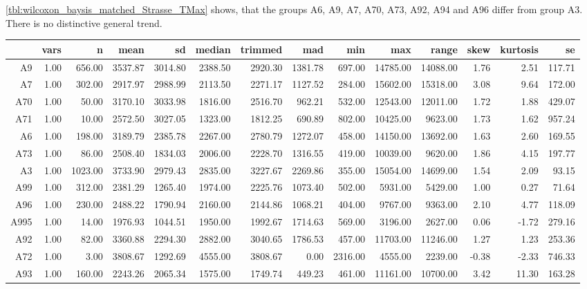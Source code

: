 \cref{tbl:wilcoxon_baysis_matched_Strasse_TMax} shows, that the groups A6, A9, A7, A70, A73, A92, A94 and A96 differ from group A3. There is no distinctive general trend.
\begin{table}[ht!]
	\tiny
	\centering
  \begin{tabular}{rrrrrrrrrrrrrr}
    \hline
    & vars & n & mean & sd & median & trimmed & mad & min & max & range & skew & kurtosis & se \\ 
    \hline
    A9   & 1.00 & 656.00 & 3537.87 & 3014.80 & 2388.50 & 2920.30 & 1381.78 & 697.00 & 14785.00 & 14088.00 & 1.76 & 2.51 & 117.71 \\ 
    A7   & 1.00 & 302.00 & 2917.97 & 2988.99 & 2113.50 & 2271.17 & 1127.52 & 284.00 & 15602.00 & 15318.00 & 3.08 & 9.64 & 172.00 \\ 
    A70  & 1.00 & 50.00 & 3170.10 & 3033.98 & 1816.00 & 2516.70 & 962.21 & 532.00 & 12543.00 & 12011.00 & 1.72 & 1.88 & 429.07 \\ 
    A71  & 1.00 & 10.00 & 2572.50 & 3027.05 & 1323.00 & 1812.25 & 690.89 & 802.00 & 10425.00 & 9623.00 & 1.73 & 1.62 & 957.24 \\ 
    A6   & 1.00 & 198.00 & 3189.79 & 2385.78 & 2267.00 & 2780.79 & 1272.07 & 458.00 & 14150.00 & 13692.00 & 1.63 & 2.60 & 169.55 \\ 
    A73  & 1.00 & 86.00 & 2508.40 & 1834.03 & 2006.00 & 2228.70 & 1316.55 & 419.00 & 10039.00 & 9620.00 & 1.86 & 4.15 & 197.77 \\ 
    A3   & 1.00 & 1023.00 & 3733.90 & 2979.43 & 2835.00 & 3227.67 & 2269.86 & 355.00 & 15054.00 & 14699.00 & 1.54 & 2.09 & 93.15 \\ 
    A99  & 1.00 & 312.00 & 2381.29 & 1265.40 & 1974.00 & 2225.76 & 1073.40 & 502.00 & 5931.00 & 5429.00 & 1.00 & 0.27 & 71.64 \\ 
    A96  & 1.00 & 230.00 & 2488.22 & 1790.94 & 2160.00 & 2144.86 & 1068.21 & 404.00 & 9767.00 & 9363.00 & 2.10 & 4.77 & 118.09 \\ 
    A995 & 1.00 & 14.00 & 1976.93 & 1044.51 & 1950.00 & 1992.67 & 1714.63 & 569.00 & 3196.00 & 2627.00 & 0.06 & -1.72 & 279.16 \\ 
    A92  & 1.00 & 82.00 & 3360.88 & 2294.30 & 2882.00 & 3040.65 & 1786.53 & 457.00 & 11703.00 & 11246.00 & 1.27 & 1.23 & 253.36 \\ 
    A72  & 1.00 & 3.00 & 3808.67 & 1292.69 & 4555.00 & 3808.67 & 0.00 & 2316.00 & 4555.00 & 2239.00 & -0.38 & -2.33 & 746.33 \\ 
    A93  & 1.00 & 160.00 & 2243.26 & 2065.34 & 1575.00 & 1749.74 & 449.23 & 461.00 & 11161.00 & 10700.00 & 3.42 & 11.30 & 163.28 \\ 

\end{tabular}
\end{table}
